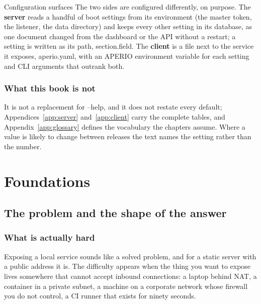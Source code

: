 \documentclass[11pt,a4paper,oneside]{book}
\newcommand{\aperiobreakableunderscore}{\textunderscore\allowbreak}
\newcommand{\aperiocodebreaks}{\XeTeXinterchartokenstate=1 }
\newcommand{\aperiocodebreaks}{}
\DeclareRobustCommand{\code}[1]{{\ttfamily\small\aperiocodebreaks
  \let\_\aperiobreakableunderscore#1}}
\begin{document}
\begin{aperionote}{Configuration surfaces}
The two sides are configured differently, on purpose. The \textbf{server}
reads a handful of boot settings from its environment (the master token,
the listener, the data directory) and keeps every other setting in its
database, as one document changed from the dashboard or the API without a
restart; a setting is written as its path, \code{section.field}. The
\textbf{client} is a file next to the service it exposes,
\code{aperio.yaml}, with an \code{APERIO\_*} environment variable for
each setting and CLI arguments that outrank both.
\end{aperionote}

\section*{What this book is not}

It is not a replacement for \code{--help}, and it does not restate every
default; Appendices~\ref{app:server} and~\ref{app:client} carry the
complete tables, and Appendix~\ref{app:glossary} defines the vocabulary
the chapters assume. Where a value is likely to change between releases the
text names the setting rather than the number.

\tableofcontents

\mainmatter

\part{Foundations}

\chapter{The problem and the shape of the answer}
\label{ch:problem}

\section{What is actually hard}

Exposing a local service sounds like a solved problem, and for a static
server with a public address it is. The difficulty appears when the thing
you want to expose lives somewhere that cannot accept inbound connections:
a laptop behind NAT, a container in a private subnet, a machine on a
corporate network whose firewall you do not control, a CI runner that
exists for ninety seconds.
\end{document}
